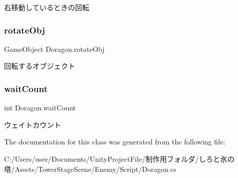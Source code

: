 右移動しているときの回転 

\mbox{\label{class_doragon_a01a776d0cd525350c471a7a5b7cec015}} 
\subsubsection{\texorpdfstring{rotate\+Obj}{rotateObj}}
{\footnotesize\ttfamily Game\+Object Doragon.\+rotate\+Obj\hspace{0.3cm}{\ttfamily [private]}}



回転するオブジェクト 

\mbox{\label{class_doragon_a1c12e99bbb3fa6cc68e0df213c0dd642}} 
\subsubsection{\texorpdfstring{wait\+Count}{waitCount}}
{\footnotesize\ttfamily int Doragon.\+wait\+Count\hspace{0.3cm}{\ttfamily [private]}}



ウェイトカウント 



The documentation for this class was generated from the following file\+:\begin{DoxyCompactItemize}
\item 
C\+:/\+Users/user/\+Documents/\+Unity\+Project\+File/制作用フォルダ/しろと氷の塔/\+Assets/\+Tower\+Stage\+Scene/\+Enemy/\+Script/Doragon.\+cs\end{DoxyCompactItemize}

